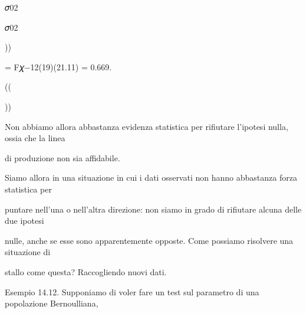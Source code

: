 \documentclass[a4paper,portrait,12pt]{article}
\begin{document}
\begin{flushleft}
𝜎02
\end{flushleft}


\begin{flushleft}
𝜎02
\end{flushleft}





))





\begin{flushleft}
= F𝜒$-$12(19)(21.11) = 0.669.
\end{flushleft}





((





))





\begin{flushleft}
Non abbiamo allora abbastanza evidenza statistica per rifiutare l'ipotesi nulla, ossia che la linea
\end{flushleft}


\begin{flushleft}
di produzione non sia affidabile.
\end{flushleft}


\begin{flushleft}
Siamo allora in una situazione in cui i dati osservati non hanno abbastanza forza statistica per
\end{flushleft}


\begin{flushleft}
puntare nell'una o nell'altra direzione: non siamo in grado di rifiutare alcuna delle due ipotesi
\end{flushleft}


\begin{flushleft}
nulle, anche se esse sono apparentemente opposte. Come possiamo risolvere una situazione di
\end{flushleft}


\begin{flushleft}
stallo come questa? Raccogliendo nuovi dati.
\end{flushleft}


\begin{flushleft}
Esempio 14.12. Supponiamo di voler fare un test sul parametro di una popolazione Bernoulliana,
\end{flushleft}
\end{document}
